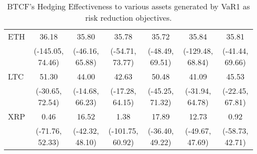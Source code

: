\begin{table}[H]
{\begin{tabular}{lcccccc}
ETH     &             36.18 &            35.80 &             35.78 &            35.72 &             35.84 &             35.81 \\
        &  (-145.05, 74.46) &  (-46.16, 65.88) &   (-54.71, 73.77) &  (-48.49, 69.51) &  (-129.48, 68.84) &   (-41.44, 69.66) \\
LTC     &             51.30 &            44.00 &             42.63 &            50.48 &             41.09 &             45.53 \\
        &   (-30.65, 72.54) &  (-14.68, 66.23) &   (-17.28, 64.15) &  (-45.25, 71.32) &   (-31.94, 64.78) &   (-22.45, 67.81) \\
XRP     &              0.46 &            16.52 &              1.38 &            17.89 &             12.73 &              0.92 \\
        &   (-71.76, 52.33) &  (-42.32, 48.10) &  (-101.75, 60.92) &  (-36.40, 49.22) &   (-49.67, 47.69) &   (-58.73, 42.71) \\
\bottomrule
\end{tabular}}
\caption{BTCF's Hedging Effectiveness to various assets generated by VaR1 as risk reduction objectives.}
\label{tab:VaR1HE}
\end{table}
